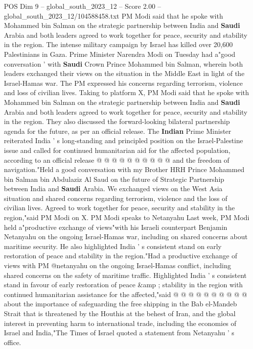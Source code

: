 \begin{textsample}{POS Dim 9 – global\_south\_2023\_12 – Score 2.00 – global\_south\_2023\_12/104588458.txt}  \label{ex:f9_pos_135}
PM Modi said that he spoke with Mohammed bin Salman on the strategic partnership between India and \textbf{Saudi} Arabia and both leaders agreed to work together for peace, security and stability in the region.
The intense military campaign by Israel has killed over 20,600 Palestinians in Gaza.
Prime Minister Narendra Modi on Tuesday had a"good conversation ' with \textbf{Saudi} Crown Prince Mohammed bin Salman, wherein both leaders exchanged their views on the situation in the Middle East in light of the Israel-Hamas war.
The PM expressed his concerns regarding terrorism, violence and loss of civilian lives.
Taking to platform X, PM Modi said that he spoke with Mohammed bin Salman on the strategic partnership between India and \textbf{Saudi} Arabia and both leaders agreed to work together for peace, security and stability in the region.
They also discussed the forward-looking bilateral partnership agenda for the future, as per an official release.
The \textbf{Indian} Prime Minister reiterated India ' s long-standing and principled position on the Israel-Palestine issue and called for continued humanitarian aid for the affected population, according to an official release @ @ @ @ @ @ @ @ @ @ and the freedom of navigation."Held a good conversation with my Brother HRH Prince Mohammed bin Salman bin Abdulaziz Al Saud on the future of Strategic Partnership between India and \textbf{Saudi} Arabia.
We exchanged views on the West Asia situation and shared concerns regarding terrorism, violence and the loss of civilian lives.
Agreed to work together for peace, security and stability in the region,"said PM Modi on X.
PM Modi speaks to Netanyahu Last week, PM Modi held a"productive exchange of views"with his Israeli counterpart Benjamin Netanyahu on the ongoing Israel-Hamas war, including on shared concerns about maritime security.
He also highlighted India ' s consistent stand on early restoration of peace and stability in the region."Had a productive exchange of views with PM @netanyahu on the ongoing Israel-Hamas conflict, including shared concerns on the safety of maritime traffic.
Highlighted India ' s consistent stand in favour of early restoration of peace \&amp ; stability in the region with continued humanitarian assistance for the affected,"said @ @ @ @ @ @ @ @ @ @ about the importance of safeguarding the free shipping in the Bab el-Mandeb Strait that is threatened by the Houthis at the behest of Iran, and the global interest in preventing harm to international trade, including the economies of Israel and India,"The Times of Israel quoted a statement from Netanyahu ' s office.

\end{textsample}
